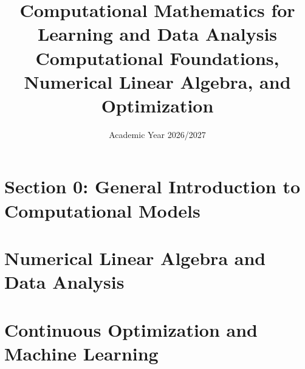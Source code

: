 \documentclass[12pt,a4paper,oneside]{report}
\title{\textbf{Computational Mathematics for Learning and Data Analysis}\\
\large Computational Foundations, Numerical Linear Algebra, and Optimization}
\author{}
\date{Academic Year 2026/2027}
\begin{document}
\maketitle
\setcounter{tocdepth}{1}
\tableofcontents

\clearpage
{}

\cleardoublepage
{}
{}
\part*{Section 0: General Introduction to Computational Models}
\setcounter{chapter}{-1}


\part{Numerical Linear Algebra and Data Analysis}







\part{Continuous Optimization and Machine Learning}







\begingroup
\sloppy
{}


\endgroup
\end{document}
